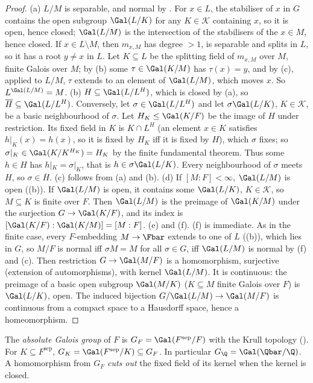 \begin{proof}
(a) $L/M$ is separable, and normal by . For $x\in L$, the stabiliser of $x$ in $G$ contains the open subgroup $\Gal(L/K)$ for any $K\in
\mathcal{K}$ containing $x$, so it is open, hence closed; $\Gal(L/M)$ is the intersection of the stabilisers of the $x\in M$, hence closed. If $x\in L\setminus M$, then
$m_{x,M}$ has degree $>1$, is separable and splits in $L$, so it has a root $y\ne x$ in $L$. Let $K\subseteq L$ be the splitting field of $m_{x,M}$ over $M$, finite Galois over $M$; by
(b) some $\tau\in\Gal(K/M)$ has $\tau(x)=y$, and by (c), applied to $L/M$, $\tau$ extends to an element of
$\Gal(L/M)$, which moves $x$. So $L^{\Gal(L/M)}=M$.
(b) $H\subseteq\Gal(L/L^H)$, which is closed by (a), so $\overline H\subseteq\Gal(L/L^H)$. Conversely, let $\sigma\in\Gal(L/L^H)$ and let $\sigma\Gal(L/K)$, $K\in\mathcal{K}$,
be a basic neighbourhood of $\sigma$. Let $H_K\le\Gal(K/F)$ be the image of $H$ under restriction. Its fixed field in $K$ is $K\cap L^H$ (an element $x\in K$ satisfies $h|_K(x)=h(x)$, so it is fixed by $H_K$ iff it is fixed by $H$), which $\sigma$ fixes; so
$\sigma|_K\in\Gal(K/K^{H_K})=H_K$ by the finite fundamental theorem. Thus some $h\in H$ has $h|_K=\sigma|_K$, that is $h\in\sigma\Gal(L/K)$. Every neighbourhood of $\sigma$
meets $H$, so $\sigma\in\overline H$.
(c) follows from (a) and (b).
(d) If $[M:F]<\infty$, $\Gal(L/M)$ is open ((b)). If $\Gal(L/M)$ is open, it contains some $\Gal(L/K)$, $K\in\mathcal{K}$, so $M\subseteq K$
is finite over $F$. Then $\Gal(L/M)$ is the preimage of $\Gal(K/M)$ under the surjection $G\to\Gal(K/F)$, and its index is $[\Gal(K/F):\Gal(K/M)]=[M:F]$.
(e) and (f). (f) is immediate. As in the finite case, every $F$-embedding $M\to\Fbar$ extends to one of $L$ ((b)), which lies in $G$,
so $M/F$ is normal iff $\sigma M=M$ for all $\sigma\in G$, iff $\Gal(L/M)$ is normal by (f) and (c). Then restriction $G\to\Gal(M/F)$ is a homomorphism, surjective
(extension of automorphisms), with kernel $\Gal(L/M)$. It is continuous: the preimage of a basic open subgroup $\Gal(M/K)$ ($K\subseteq M$ finite Galois over $F$) is
$\Gal(L/K)$, open. The induced bijection $G/\Gal(L/M)\to\Gal(M/F)$ is continuous from a compact space to a Hausdorff space, hence a homeomorphism.
\end{proof}

\begin{definition}\label{def:galois:absolute}
The \emph{absolute Galois group} of $F$ is $G_F=\Gal(F^{\mathrm{sep}}/F)$ with the Krull topology (). For $K\subseteq F^{\mathrm{sep}}$,
$G_K=\Gal(F^{\mathrm{sep}}/K)\subseteq G_F$. In particular $G_\Q=\Gal(\Qbar/\Q)$. A homomorphism from $G_F$ \emph{cuts out} the fixed field of its kernel when
the kernel is closed.
\end{definition}

